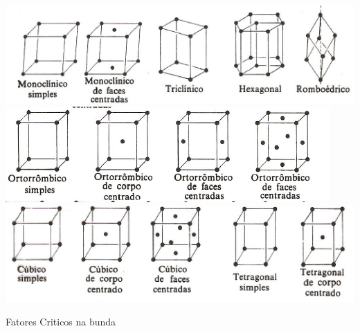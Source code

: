  \includegraphics[scale=0.5,trim={0 0 0 0}]{figures/var1}
 \includegraphics[scale=0.45,trim={0 0 0 0}]{figures/var2}
 \includegraphics[scale=0.5,trim={0 0 0 0}]{figures/var3}


 

Fatores Criticos na bunda
 
